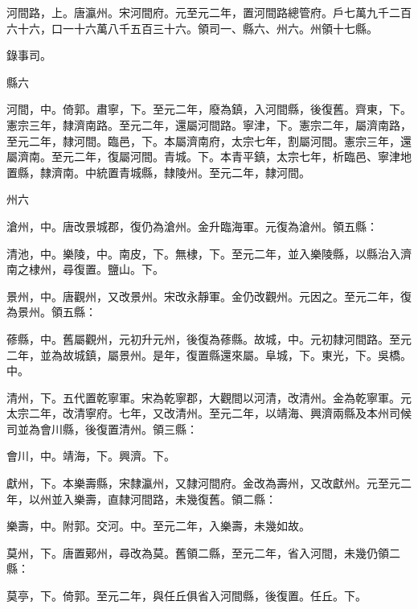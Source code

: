 \begin{pinyinscope}
 河間路，上。唐瀛州。宋河間府。元至元二年，置河間路總管府。戶七萬九千二百六十六，口一十六萬八千五百三十六。領司一、縣六、州六。州領十七縣。



 錄事司。



 縣六



 河間，中。倚郭。肅寧，下。至元二年，廢為鎮，入河間縣，後復舊。齊東，下。憲宗三年，隸濟南路。至元二年，還屬河間路。寧津，下。憲宗二年，屬濟南路，至元二年，隸河間。臨邑，下。本屬濟南府，太宗七年，割屬河間。憲宗三年，還屬濟南。至元二年，復屬河間。青城。下。本青平鎮，太宗七年，析臨邑、寧津地置縣，隸濟南。中統置青城縣，隸陵州。至元二年，隸河間。



 州六



 滄州，中。唐改景城郡，復仍為滄州。金升臨海軍。元復為滄州。領五縣：



 清池，中。樂陵，中。南皮，下。無棣，下。至元二年，並入樂陵縣，以縣治入濟南之棣州，尋復置。鹽山。下。



 景州，中。唐觀州，又改景州。宋改永靜軍。金仍改觀州。元因之。至元二年，復為景州。領五縣：



 蓚縣，中。舊屬觀州，元初升元州，後復為蓚縣。故城，中。元初隸河間路。至元二年，並為故城鎮，屬景州。是年，復置縣還來屬。阜城，下。東光，下。吳橋。中。



 清州，下。五代置乾寧軍。宋為乾寧郡，大觀間以河清，改清州。金為乾寧軍。元太宗二年，改清寧府。七年，又改清州。至元二年，以靖海、興濟兩縣及本州司候司並為會川縣，後復置清州。領三縣：



 會川，中。靖海，下。興濟。下。



 獻州，下。本樂壽縣，宋隸瀛州，又隸河間府。金改為壽州，又改獻州。元至元二年，以州並入樂壽，直隸河間路，未幾復舊。領二縣：



 樂壽，中。附郭。交河。中。至元二年，入樂壽，未幾如故。



 莫州，下。唐置鄚州，尋改為莫。舊領二縣，至元二年，省入河間，未幾仍領二縣：



 莫亭，下。倚郭。至元二年，與任丘俱省入河間縣，後復置。任丘。下。




\end{pinyinscope}
